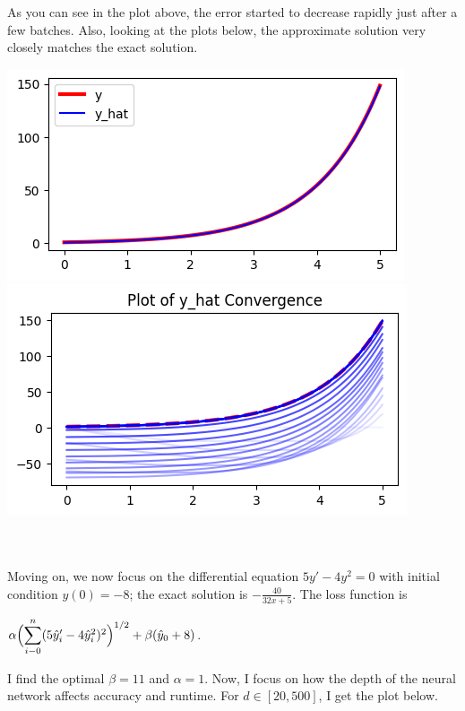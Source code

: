 \documentclass[12pt]{article}
\newcommand{\dsum}[2]{\mathlarger{\sum}_{#1}^{#2}}
\newcommand{\bgc}{\begin{center}}
\newcommand{\enc}{\end{center}}
\begin{document}
\begin{description}
\begin{minipage}{\linewidth}
    \end{minipage}
    As you can see in the plot above, the error started to decrease rapidly
    just after a few batches. Also, looking at the plots below, the approximate
    solution very closely matches the exact solution. \\
    \begin{minipage}{\linewidth}
        \centering
        \includegraphics[scale=.5]{images/figure3.png}
        \includegraphics[scale=.5]{images/figure4.png}
    \end{minipage}
    \hfill \\
    \hline
    \hfill \\
    Moving on, we now focus on the differential equation $5y' - 4y^2 = 0$ with
    initial condition $y(0) = -8$; the exact solution is $-\frac{40}{32x+5}$.
    The loss function is 
    \bgc 
    $\alpha\Bigl(\dsum{i-0}{n}(5\hat{y}_i' - 4\hat{y}_i^2)^2\Bigr)^{1/2} + \beta(\hat{y}_0 + 8)$.
    \enc
    I find the optimal $\beta = 11$ and $\alpha=1$. Now, I focus on how the
    depth of the neural network affects accuracy and runtime. For $d\in[20,
    500]$, I get the plot below.  \\ 
    \begin{minipage}{\linewidth}
        \centering

\end{minipage}
\end{description}
\end{document}
